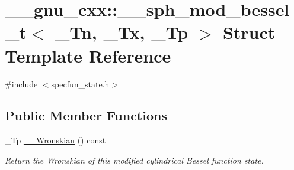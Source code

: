 \hypertarget{struct____gnu__cxx_1_1____sph__mod__bessel__t}{}\section{\+\_\+\+\_\+gnu\+\_\+cxx\+:\+:\+\_\+\+\_\+sph\+\_\+mod\+\_\+bessel\+\_\+t$<$ \+\_\+\+Tn, \+\_\+\+Tx, \+\_\+\+Tp $>$ Struct Template Reference}
\label{struct____gnu__cxx_1_1____sph__mod__bessel__t}


{\ttfamily \#include $<$specfun\+\_\+state.\+h$>$}

\subsection*{Public Member Functions}
\begin{DoxyCompactItemize}
\item 
\+\_\+\+Tp \hyperlink{struct____gnu__cxx_1_1____sph__mod__bessel__t_afbe229c1b0faafc786c78eee38e52d0a}{\+\_\+\+\_\+\+Wronskian} () const
\begin{DoxyCompactList}\small\item\em Return the Wronskian of this modified cylindrical Bessel function state. \end{DoxyCompactList}\end{DoxyCompactItemize}
